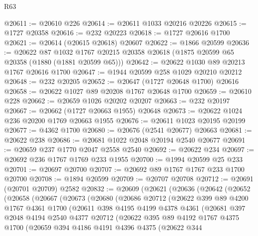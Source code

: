 \begin{lexlean}{R63}
\begin{coremodule}
@20611 := @20610 @226
@20614 := @20611 @1033 @20216 @20226
@20615 := @1727 @20358
@20616 := @232 @20223
@20618 := @1727 @20616 @1700
@20621 := @20614 (@20615 @20618) @20607
@20622 := @1866 @20599
@20636 := @20622
    @87
    @1032
    @1767
    @20215
    @20358
    @20618
    (@1875 @20599 @65 @20358 (@1880 (@1881 @20599 @65)))
@20642 := @20622 @1030 @89 @20213 @1767 @20616 @1700
@20647 := @1944 @20599 @258 @1029 @20210 @20212
@20648 := @232 @20205
@20652 := @20647 (@1727 @20648 @1700) @20616
@20658 := @20622 @1027 @89 @20208 @1767 @20648 @1700
@20659 := @20610 @228
@20662 := @20659 @1026 @20202 @20207
@20663 := @232 @20197
@20667 := @20662 (@1727 @20663 @1955) @20648
@20673 := @20622 @1024 @236 @20200 @1769 @20663 @1955
@20676 := @20611 @1023 @20195 @20199
@20677 := @4362 @1700
@20680 := @20676 (@2541 @20677) @20663
@20681 := @20622 @238
@20686 := @20681 @1022 @2048 @20194 @2540 @20677
@20691 := @20659 @237 @1770 @2047 @2558 @2540
@20692 := @20622 @234
@20697 := @20692 @236 @1767 @1769 @233 @1955
@20700 := @1994 @20599 @25 @233
@20701 := @20697 @20700
@20707 := @20692 @89 @1767 @1767 @233 @1700 @20700
@20708 := @1894 @20599
@20709 := @20707 @20708
@20712 := @20691 (@20701 @20709) @2582
@20832 := @20609
    (@20621
      (@20636
        (@20642
          (@20652
            (@20658
              (@20667
                (@20673
                  (@20680
                    (@20686
                      @20712
                      (@20622
                        @399
                        @89
                        @4200
                        @1767
                        @4361
                        @1700
                        (@20611
                          @398
                          @4195
                          @4199
                          @4378
                          @4361
                          (@20681
                            @397
                            @2048
                            @4194
                            @2540
                            @4377
                            @20712
                            (@20622
                              @395
                              @89
                              @4192
                              @1767
                              @4375
                              @1700
                              (@20659
                                @394
                                @4186
                                @4191
                                @4396
                                @4375
                                (@20622
                                  @344

\end{coremodule}
\end{lexlean}
